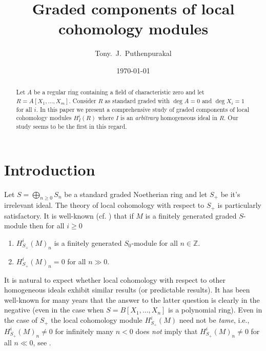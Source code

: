 \documentclass{amsart}
\newcommand{\ZZ}{\mathbb{Z} }
\theoremstyle{plain}
\theoremstyle{definition}
\theoremstyle{remark}
\begin{document}
\title{Graded components of local cohomology modules }
\author{Tony.~J.~Puthenpurakal}
\date{\today}
\address{Department of Mathematics, IIT Bombay, Powai, Mumbai 400 076}

 \begin{abstract}
Let $A$ be a regular ring containing a field of characteristic zero and let $R = A[X_1,\ldots, X_m]$. Consider $R$ as standard
graded with $\deg A = 0$ and $\deg X_i = 1$ for all $i$. In this paper we present a comprehensive study of graded components of
local cohomology modules
$H^i_I(R)$ where $I$ is an \emph{arbitrary} homogeneous ideal in $R$. Our study seems to be the first in this regard. 
\end{abstract}
 \maketitle
 \tableofcontents
\newpage
\section{Introduction}
Let $S = \bigoplus_{n \geq 0}S_n$ be a standard graded Noetherian ring and let $S_+$ be it's irrelevant ideal. The theory of local cohomology with respect to $S_+$ is particularly satisfactory. It is well-known (cf. \cite[15.1.5]{BS}) that if $M$ is a finitely generated 
graded $S$-module then  for all $i \geq 0$
\begin{enumerate}
\item
$H^i_{S_+}(M)_n$ is a finitely generated $S_0$-module for all $n \in \ZZ$.
\item
$H^i_{S_+}(M)_n = 0$ for all $n \gg 0$.
\end{enumerate}
It is natural to expect whether local cohomology with respect to other homogeneous 
ideals exhibit similar results (or predictable results). It has been well-known for many years that the answer to the latter question is clearly in the negative
(even in the case when $S = B[X_1,\ldots, X_n]$ is a polynomial ring). Even in the case of $S_+$ the
local cohomology module $H^i_{S_+}(M)$ need not be \emph{tame}, i.e., $H^i_{S_+}(M)_n \neq 0$ for infinitely many $n < 0$
does \emph{not} 
imply that $H^i_{S_+}(M)_n \neq 0$ for all $n \ll 0$, see \cite[2.2]{CH}. 
\end{document}
